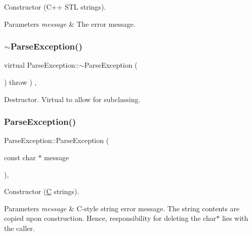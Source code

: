 Constructor (C++ S\+TL strings). 
\begin{DoxyParams}{Parameters}
{\em message} & The error message. \\
\hline
\end{DoxyParams}
\mbox{\label{classParseException_a59f11745728ad1ede341f2dda48e79b6}} 
\subsubsection{\texorpdfstring{$\sim$\+Parse\+Exception()}{~ParseException()}\hspace{0.1cm}{\footnotesize\ttfamily [1/3]}}
{\footnotesize\ttfamily virtual Parse\+Exception\+::$\sim$\+Parse\+Exception (\begin{DoxyParamCaption}{ }\end{DoxyParamCaption}) throw  ) \hspace{0.3cm}{\ttfamily [inline]}, {\ttfamily [virtual]}}

Destructor. Virtual to allow for subclassing. \mbox{\label{classParseException_a0e2db737183a1801d528102617ddc3c4}} 
\subsubsection{\texorpdfstring{Parse\+Exception()}{ParseException()}\hspace{0.1cm}{\footnotesize\ttfamily [3/6]}}
{\footnotesize\ttfamily Parse\+Exception\+::\+Parse\+Exception (\begin{DoxyParamCaption}\item[{const char $\ast$}]{message }\end{DoxyParamCaption})\hspace{0.3cm}{\ttfamily [inline]}, {\ttfamily [explicit]}}

Constructor (\hyperlink{classC}{C} strings). 
\begin{DoxyParams}{Parameters}
{\em message} & C-\/style string error message. The string contents are copied upon construction. Hence, responsibility for deleting the char$\ast$ lies with the caller. \\
\hline
\end{DoxyParams}
\mbox{\label{classParseException_a162b338172e869ef6e308b4489abf95b}} 
